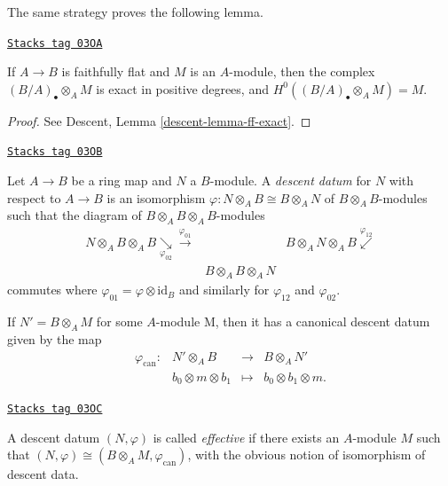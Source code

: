 \medskip\noindent
The same strategy proves the following lemma.

\begin{lemma}
\label{etale-cohomology-lemma-descent-modules}
\href{https://stacks.math.columbia.edu/tag/03OA}{\texttt{Stacks tag 03OA}}

If $A \to B$ is faithfully flat and $M$ is an $A$-module, then the
complex $(B/A)_\bullet \otimes_A M$ is exact in positive degrees, and
$H^0((B/A)_\bullet \otimes_A M) = M$.
\end{lemma}

\begin{proof}
See Descent, Lemma \ref{descent-lemma-ff-exact}.
\end{proof}

\begin{definition}
\label{etale-cohomology-definition-descent-datum-modules}
\href{https://stacks.math.columbia.edu/tag/03OB}{\texttt{Stacks tag 03OB}}

Let $A \to B$ be a ring map and $N$ a $B$-module. A {\it descent datum} for
$N$ with respect to $A \to B$ is an isomorphism
$\varphi : N \otimes_A B \cong B \otimes_A N$ of $B \otimes_A B$-modules such
that the diagram of $B \otimes_A B \otimes_A B$-modules
$$
\begin{array}{ccc}{N \otimes_A B \otimes_A B} \underset{\varphi_{02}}{\searrow}\overset{\varphi_{01}}{\longrightarrow} &  & {B \otimes_A N \otimes_A B} \overset{\varphi_{12}}{\swarrow} \\  & {B \otimes_A B \otimes_A N} & \end{array}
$$
commutes where $\varphi_{01} = \varphi \otimes \text{id}_B$ and similarly
for $\varphi_{12}$ and $\varphi_{02}$.
\end{definition}

If $N' = B \otimes_A M$ for some $A$-module M, then it has a canonical descent
datum given by the map
$$
\begin{matrix}
\varphi_\text{can}: & N' \otimes_A B & \to & B \otimes_A N' \\
& b_0 \otimes m \otimes b_1 & \mapsto & b_0 \otimes b_1 \otimes m.
\end{matrix}
$$

\begin{definition}
\label{etale-cohomology-definition-effective-modules}
\href{https://stacks.math.columbia.edu/tag/03OC}{\texttt{Stacks tag 03OC}}

A descent datum $(N, \varphi)$ is called {\it effective} if there exists an
$A$-module $M$ such that $(N, \varphi) \cong (B \otimes_A M,
\varphi_\text{can})$, with the obvious notion of isomorphism of descent data.
\end{definition}

